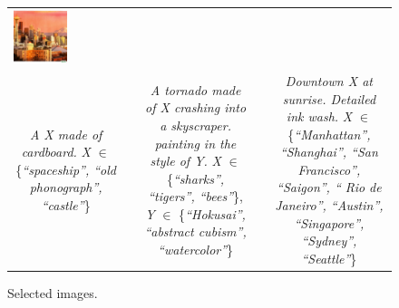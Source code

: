 \begin{figure}[ht!]
\begin{adjustwidth}{-0.8in}{-0.5in}
\begin{tabular}{cccccccccccccccccccc}
\multicolumn{2}{c}{\includegraphics[width=\threebythreecolwidth\textwidth]{figures/cherries/ink_9_seattle.jpg}} \\


\multicolumn{6}{p{\thirdcolwidth\textwidth}}{{\tiny \textit{A X made of cardboard.} \textit{X} $\in$ \{\textit{``spaceship'', ``old phonograph'', ``castle''}\}}} &&
\multicolumn{6}{p{\thirdcolwidth\textwidth}}{{\tiny \textit{A tornado made of X crashing into a skyscraper. painting in the style of Y.} \textit{X} $\in$ \{\textit{``sharks'', ``tigers'', ``bees''}\},  \textit{Y} $\in$ \{\textit{``Hokusai'', ``abstract cubism'', ``watercolor''}\}}} &&
\multicolumn{6}{p{\thirdcolwidth\textwidth}}{{\tiny \textit{Downtown X at sunrise. Detailed ink wash.} \textit{X} $\in$ \{\textit{``Manhattan'', ``Shanghai'', ``San Francisco'', ``Saigon'', ``
Rio de Janeiro'', ``Austin'', ``Singapore'', ``Sydney'', ``Seattle''}\}}} \\
\end{tabular}
\end{adjustwidth}
\caption{Selected \bdraw images.}
\label{figs:appendix_cherry4}
\end{figure}
